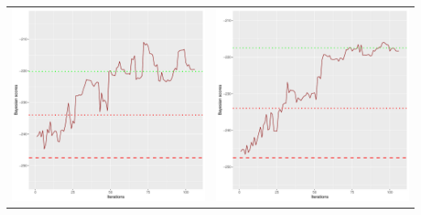\documentclass[]{scrartcl}
\begin{document}
\begin{table}[h!]
\begin{tabular}{cc}
\includegraphics[scale = 0.4]{./figs/asia/v2/10/bayBoundsEvolution-107.pdf} & 
\includegraphics[scale = 0.4]{./figs/asia/v2/20/bayBoundsEvolution-107.pdf} \\

\end{tabular}
\end{table}
\end{document}
